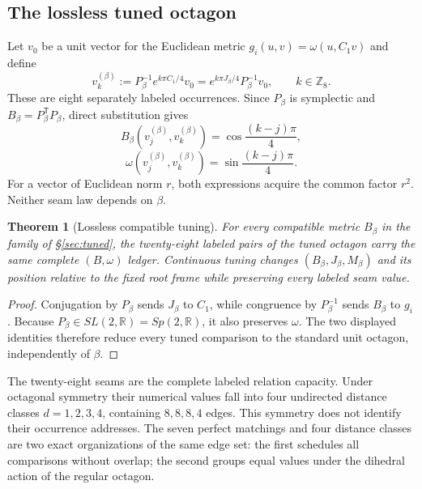 \documentclass[10pt]{article}
\newtheorem{theorem}{Theorem}
\newcommand{\R}{\mathbb R}
\newcommand{\Z}{\mathbb Z}
\begin{document}
\subsection*{The lossless tuned octagon}
Let $v_0$ be a unit vector for the Euclidean metric
$g_i(u,v)=\omega(u,C_1v)$ and define
\begin{equation}
v_k^{(\beta)}:=P_\beta^{-1}e^{k\pi C_1/4}v_0
=e^{k\pi J_\beta/4}P_\beta^{-1}v_0,\qquad k\in\Z_8.
\end{equation}
These are eight separately labeled occurrences. Since $P_\beta$ is symplectic and
$B_\beta=P_\beta^{\mathsf T}P_\beta$, direct substitution gives
\begin{equation}
\boxed{B_\beta(v_j^{(\beta)},v_k^{(\beta)})
=\cos\frac{(k-j)\pi}{4},}
\end{equation}
\begin{equation}
\boxed{\omega(v_j^{(\beta)},v_k^{(\beta)})
=\sin\frac{(k-j)\pi}{4}.}
\end{equation}
For a vector of Euclidean norm $r$, both expressions acquire the common factor $r^2$. Neither seam law depends on $\beta$.

\begin{theorem}[Lossless compatible tuning]
For every compatible metric $B_\beta$ in the family of \S\ref{sec:tuned}, the twenty-eight labeled pairs of the tuned octagon carry the same complete $(B,\omega)$ ledger. Continuous tuning changes $(B_\beta,J_\beta,M_\beta)$ and its position relative to the fixed root frame while preserving every labeled seam value.
\end{theorem}
\begin{proof}
Conjugation by $P_\beta$ sends $J_\beta$ to $C_1$, while congruence by $P_\beta^{-1}$ sends $B_\beta$ to $g_i$. Because $P_\beta\in SL(2,\R)=Sp(2,\R)$, it also preserves $\omega$. The two displayed identities therefore reduce every tuned comparison to the standard unit octagon, independently of $\beta$.
\end{proof}

The twenty-eight seams are the complete labeled relation capacity. Under octagonal symmetry their numerical values fall into four undirected distance classes $d=1,2,3,4$, containing $8,8,8,4$ edges. This symmetry does not identify their occurrence addresses. The seven perfect matchings and four distance classes are two exact organizations of the same edge set: the first schedules all comparisons without overlap; the second groups equal values under the dihedral action of the regular octagon.
\end{document}
